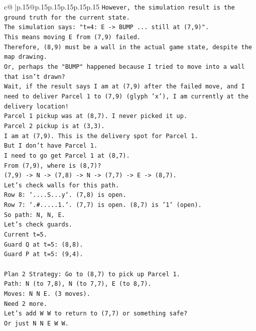 \documentclass{article}
\begin{document}
{\begin{supertabular}{c@{$\;$}|p{.15\linewidth}@{}p{.15\linewidth}p{.15\linewidth}p{.15\linewidth}p{.15\linewidth}p{.15\linewidth}}
{{{\texttt{However, the simulation result is the ground truth for the current state.} \\
\texttt{The simulation says: "t=4: E {-}> BUMP ... still at (7,9)".} \\
\texttt{This means moving E from (7,9) failed.} \\
\texttt{Therefore, (8,9) must be a wall in the actual game state, despite the map drawing.} \\
\texttt{Or, perhaps the "BUMP" happened because I tried to move into a wall that isn't drawn?} \\
\texttt{Wait, if the result says I am at (7,9) after the failed move, and I need to deliver Parcel 1 to (7,9) (glyph 'x'), I am currently at the delivery location!} \\
\texttt{Parcel 1 pickup was at (8,7). I never picked it up.} \\
\texttt{Parcel 2 pickup is at (3,3).} \\
\texttt{I am at (7,9). This is the delivery spot for Parcel 1.} \\
\texttt{But I don't have Parcel 1.} \\
\texttt{I need to go get Parcel 1 at (8,7).} \\
\texttt{From (7,9), where is (8,7)?} \\
\texttt{(7,9) {-}> N {-}> (7,8) {-}> N {-}> (7,7) {-}> E {-}> (8,7).} \\
\texttt{Let's check walls for this path.} \\
\texttt{Row 8: `....S...y`. (7,8) is open.} \\
\texttt{Row 7: `.\#.....1.`. (7,7) is open. (8,7) is '1' (open).} \\
\texttt{So path: N, N, E.} \\
\texttt{Let's check guards.} \\
\texttt{Current t=5.} \\
\texttt{Guard Q at t=5: (8,8).} \\
\texttt{Guard P at t=5: (9,4).} \\
\\ 
\texttt{Plan 2 Strategy: Go to (8,7) to pick up Parcel 1.} \\
\texttt{Path: N (to 7,8), N (to 7,7), E (to 8,7).} \\
\texttt{Moves: N N E. (3 moves).} \\
\texttt{Need 2 more.} \\
\texttt{Let's add W W to return to (7,7) or something safe?} \\
\texttt{Or just N N E W W.} \\
}}}
\end{supertabular}}
\end{document}

